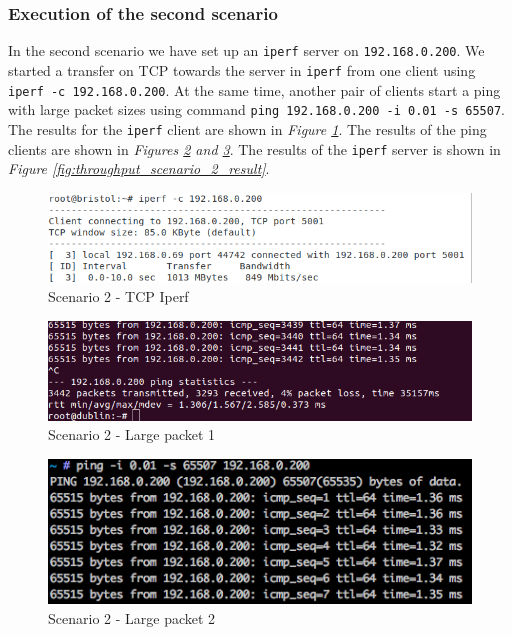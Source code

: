 \documentclass{article}
\begin{document}
\subsubsection{Execution of the second scenario}
In the second scenario we have set up an \texttt{iperf} server on \texttt{192.168.0.200}. We started a transfer on TCP towards the server in \texttt{iperf} from one client using \texttt{iperf -c 192.168.0.200}. At the same time, another pair of clients start a ping with large packet sizes using command \texttt{ping 192.168.0.200 -i 0.01 -s 65507}. The results for the \texttt{iperf} client are shown in \textit{Figure \ref{fig:throughput_scenario_2}}. The results of the ping clients are shown in \textit{Figures \ref{fig:throughput_scenario_2_ping_1} and \ref{fig:throughput_scenario_2_ping_2}}. The results of the \texttt{iperf} server is shown in \textit{Figure \ref{fig:throughput_scenario_2_result}}. 

\begin{figure}[H]
\includegraphics[width=14cm]{figures/q2-2-2-1.png}
\centering
\caption{Scenario 2 - TCP Iperf}
\centering
\label{fig:throughput_scenario_2}
\end{figure}

\begin{figure}[H]
\includegraphics[width=14cm]{figures/q2-2-2-ping-2.png}
\centering
\caption{Scenario 2 - Large packet 1}
\centering
\label{fig:throughput_scenario_2_ping_1}
\end{figure}

\begin{figure}[H]
\includegraphics[width=14cm]{figures/q2-2-2-ping-1.png}
\centering
\caption{Scenario 2 - Large packet 2}
\centering
\label{fig:throughput_scenario_2_ping_2}
\end{figure}
\end{document}
